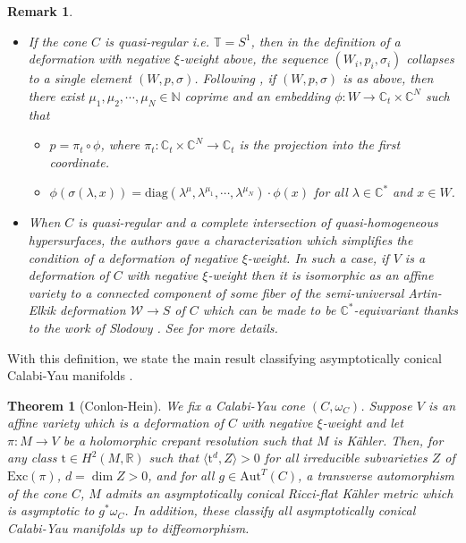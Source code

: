 \documentclass[a4paper,11pt]{article}
\newcounter{mythm}[section]
\newtheorem{tm}[mythm]{Theorem}
\newtheorem{rem}[mythm]{Remark}
\def\C{\mathbb{C}}
\def\R{\mathbb{R}}
\def\N{\mathbb{N}}
\begin{document}
\begin{rem} \label{remark negative weight}
\hfill
\begin{itemize}
    \item If the cone $C$ is quasi-regular i.e. $\mathbb{T} = S^1$, then in the definition of a deformation with negative $\xi$-weight above, the sequence $(W_i, p_i, \sigma_i)$ collapses to a single element $(W, p, \sigma)$. Following \cite[Theorem 2.2]{conlon_classification_2024}, if $(W,p, \sigma)$ is as above, then there exist $\mu_1, \mu_2, \cdots, \mu_N \in \N$ coprime and an embedding $\phi : W \rightarrow \C_t \times \C^N$ such that 
    \begin{itemize}
        \item $p = \pi_t \circ \phi$, where $\pi_t : \C_t \times \C^N \rightarrow \C_t $ is the projection into the first coordinate.
        \item $\phi (\sigma(\lambda, x)) = \mathrm{diag}(\lambda^\mu, \lambda^{\mu_1}, \cdots, \lambda^{\mu_N}) \cdot \phi(x)$ for all $\lambda \in \C^{*}$ and $x \in W$.
    \end{itemize}
    \item When $C$ is quasi-regular and a complete intersection of quasi-homogeneous hypersurfaces, the authors gave a characterization \cite[Lemma 4.1]{conlon_classification_2024} which simplifies the condition of a deformation of negative $\xi$-weight. In such a case, if $V$ is a deformation of $C$ with negative $\xi$-weight then it is isomorphic as an affine variety to a connected component of some fiber of the semi-universal Artin-Elkik \cite{artin1976lectures, Elkik} deformation $\mathcal{W} \rightarrow S$ of $C$ which can be made to be $\C^{*}$-equivariant thanks to the work of Slodowy \cite{MR584445}. See \cite[Section 4.1]{conlon_classification_2024} for more details.
    \end{itemize}
\end{rem}
With this definition, we state the main result classifying asymptotically conical Calabi-Yau manifolds \cite[Theorem A, Theorem B]{conlon_classification_2024}.
\begin{tm}[Conlon-Hein] \label{ConHein}
We fix a Calabi-Yau cone $(C, \omega_C)$. Suppose $V$ is an affine variety which is a deformation of $C$ with negative $\xi$-weight and let $\pi : M \rightarrow V$ be a holomorphic crepant resolution such that $M$ is Kähler. Then, for any class $\mathrm{t} \in H^2(M, \R)$ such that $\langle\mathrm{t}^d , Z \rangle >0$ for all irreducible subvarieties $Z$ of $\mathrm{Exc} (\pi)$, $d = \dim Z >0$, and for all $g \in \mathrm{Aut}^{T}(C)$, a transverse automorphism of the cone $C$, $M$ admits an asymptotically conical Ricci-flat Kähler metric which is asymptotic to $g^{*}\omega_C$. In addition, these classify all asymptotically conical Calabi-Yau manifolds up to diffeomorphism.
\end{tm}
\end{document}
